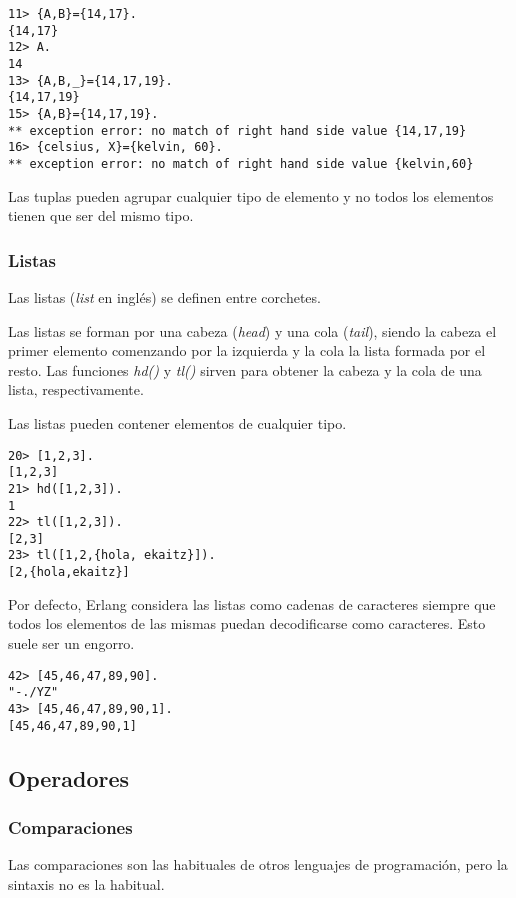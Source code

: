 \begin{lstlisting}
11> {A,B}={14,17}.
{14,17}
12> A.
14
13> {A,B,_}={14,17,19}.
{14,17,19}
15> {A,B}={14,17,19}.
** exception error: no match of right hand side value {14,17,19}
16> {celsius, X}={kelvin, 60}.
** exception error: no match of right hand side value {kelvin,60}
\end{lstlisting}

Las tuplas pueden agrupar cualquier tipo de elemento y no todos los elementos tienen que ser del mismo tipo.

\subsubsection{Listas}

Las listas (\textit{list} en inglés) se definen entre corchetes.

Las listas se forman por una cabeza (\textit{head}) y una cola (\textit{tail}), siendo la cabeza el primer
elemento comenzando por la izquierda y la cola la lista formada por el resto. Las funciones \textit{hd()} y
\textit{tl()} sirven para obtener la cabeza y la cola de una lista, respectivamente.

Las listas pueden contener elementos de cualquier tipo.

\begin{lstlisting}
20> [1,2,3].
[1,2,3]
21> hd([1,2,3]).
1
22> tl([1,2,3]).
[2,3]
23> tl([1,2,{hola, ekaitz}]).
[2,{hola,ekaitz}]
\end{lstlisting}

Por defecto, Erlang considera las listas como cadenas de caracteres siempre que todos los elementos de las
mismas puedan decodificarse como caracteres. Esto suele ser un engorro.
\begin{lstlisting}
42> [45,46,47,89,90].
"-./YZ"
43> [45,46,47,89,90,1].
[45,46,47,89,90,1]
\end{lstlisting}



\subsection{Operadores}

\subsubsection{Comparaciones}

Las comparaciones son las habituales de otros lenguajes de programación, pero la sintaxis no es la habitual.

